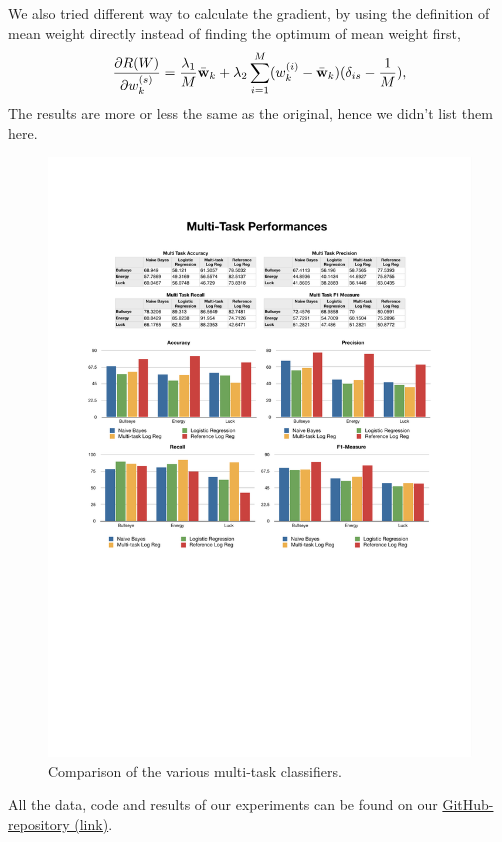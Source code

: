We also tried different way to calculate the gradient, by using the definition of mean weight directly instead of finding the optimum of mean weight first, 
\begin{align*}
\frac{\partial R(W)}{\partial w_k^{(s)}} = \frac{\lambda_1}{M} \bar{\textbf{w}}_k + \lambda_2 \sum_{i=1}^{M}(w_k^{(i)} - \bar{\textbf{w}}_k)(\delta_{is} - \frac{1}{M}),
\end{align*}
The results are more or less the same as the original, hence we didn't list them here. 
%
\begin{figure}
    \centering
    \setlength{\tabcolsep}{0.0130\linewidth}
    \includegraphics[width=\linewidth]{figures/MultiTask}
    \caption{Comparison of the various multi-task classifiers.%
      \label{fig:multitask}}
\end{figure}


All the data, code and results of our experiments can be found on our 
\href{https://github.com/johnnyyan/515project}{GitHub-repository (link)}.

